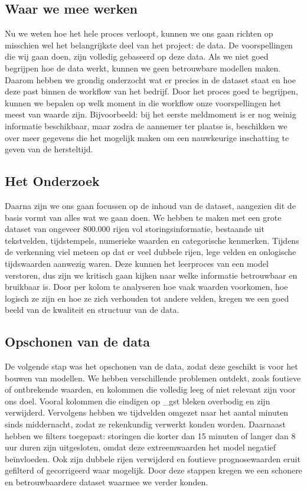 \documentclass{article}
\begin{document}
\subsection{Waar we mee werken}
Nu we weten hoe het hele proces verloopt, kunnen we ons gaan richten op misschien wel het belangrijkste deel van het project: de data. De voorspellingen die wij gaan doen, zijn volledig gebaseerd op deze data. Als we niet goed begrijpen hoe de data werkt, kunnen we geen betrouwbare modellen maken. Daarom hebben we grondig onderzocht wat er precies in de dataset staat en hoe deze past binnen de workflow van het bedrijf. Door het proces goed te begrijpen, kunnen we bepalen op welk moment in die workflow onze voorspellingen het meest van waarde zijn. Bijvoorbeeld: bij het eerste meldmoment is er nog weinig informatie beschikbaar, maar zodra de aannemer ter plaatse is, beschikken we over meer gegevens die het mogelijk maken om een nauwkeurige inschatting te geven van de hersteltijd.

\subsection{Het Onderzoek}
Daarna zijn we ons gaan focussen op de inhoud van de dataset, aangezien dit de basis vormt van alles wat we gaan doen. We hebben te maken met een grote dataset van ongeveer 800.000 rijen vol storingsinformatie, bestaande uit tekstvelden, tijdstempels, numerieke waarden en categorische kenmerken. Tijdens de verkenning viel meteen op dat er veel dubbele rijen, lege velden en onlogische tijdswaarden aanwezig waren. Deze kunnen het leerproces van een model verstoren, dus zijn we kritisch gaan kijken naar welke informatie betrouwbaar en bruikbaar is. Door per kolom te analyseren hoe vaak waarden voorkomen, hoe logisch ze zijn en hoe ze zich verhouden tot andere velden, kregen we een goed beeld van de kwaliteit en structuur van de data.

\subsection{Opschonen van de data}
De volgende stap was het opschonen van de data, zodat deze geschikt is voor het bouwen van modellen. We hebben verschillende problemen ontdekt, zoals foutieve of ontbrekende waarden, en kolommen die volledig leeg of niet relevant zijn voor ons doel. Vooral kolommen die eindigen op \_gst bleken overbodig en zijn verwijderd. Vervolgens hebben we tijdvelden omgezet naar het aantal minuten sinds middernacht, zodat ze rekenkundig verwerkt konden worden. Daarnaast hebben we filters toegepast: storingen die korter dan 15 minuten of langer dan 8 uur duren zijn uitgesloten, omdat deze extreemwaarden het model negatief beïnvloeden. Ook zijn dubbele rijen verwijderd en foutieve prognosewaarden eruit gefilterd of gecorrigeerd waar mogelijk. Door deze stappen kregen we een schonere en betrouwbaardere dataset waarmee we verder konden.
\end{document}
